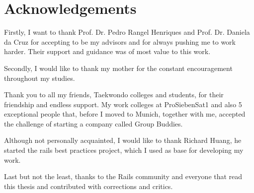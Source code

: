 \thispagestyle{empty}
\chapter*{Acknowledgements}\label{chap:acknowledgements}

Firstly, I want to thank Prof. Dr. Pedro Rangel Henriques and Prof. Dr. Daniela da Cruz 
for accepting to be my advisors and for always pushing me to work harder. 
Their support and guidance was of most value to this work.

Secondly, I would like to thank my mother for the constant encouragement throughout my studies.

Thank you to all my friends, Taekwondo colleges and students, for their friendship and endless support.
My work colleges at ProSiebenSat1 and also 5 exceptional people that, before I moved to Munich, together with me, accepted the challenge of starting a company called Group Buddies.

Although not personally acquainted, I would like to thank Richard Huang, he started the rails best practices project, 
which I used as base for developing my work.  

Last but not the least, thanks to the Rails community and everyone that read this thesis and contributed with corrections and critics.